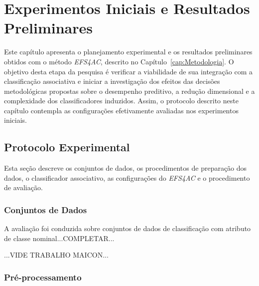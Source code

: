 \chapter{Experimentos Iniciais e Resultados Preliminares}\label{cap:experimentos-iniciais}

Este capítulo apresenta o planejamento experimental e os resultados preliminares
obtidos com o método \textit{EFS4AC}, descrito no
Capítulo~\ref{cap:Metodologia}. O objetivo desta etapa da pesquisa é verificar
a viabilidade de sua integração com a classificação associativa e iniciar a
investigação dos efeitos das decisões metodológicas propostas sobre o desempenho
preditivo, a redução dimensional e a complexidade dos classificadores induzidos. Assim, o protocolo descrito
neste capítulo contempla as configurações efetivamente avaliadas nos experimentos iniciais.

\section{Protocolo Experimental}\label{sec:exp-protocolo}

Esta seção descreve os conjuntos de dados, os procedimentos de preparação dos dados,
o classificador associativo, as configurações do \textit{EFS4AC} e o procedimento
de avaliação.

\subsection{Conjuntos de Dados}\label{subsec:exp-bases}

A avaliação foi conduzida sobre conjuntos de dados de classificação com
atributo de classe nominal...COMPLETAR...

...VIDE TRABALHO MAICON...

\subsection{Pré-processamento}\label{subsec:exp-preprocessamento}

